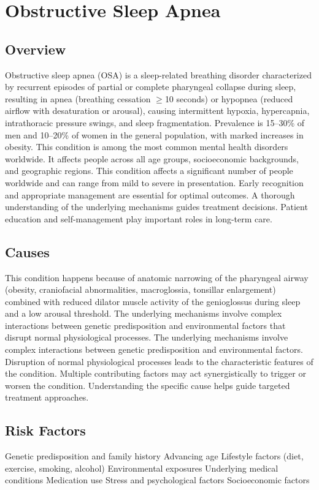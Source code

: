 \chapter{Obstructive Sleep Apnea}
\label{sec:Obstructive Sleep Apnea}

\section{Overview}
Obstructive sleep apnea (OSA) is a sleep-related breathing disorder characterized by recurrent episodes of partial or complete pharyngeal collapse during sleep, resulting in apnea (breathing cessation $\ge$10 seconds) or hypopnea (reduced airflow with desaturation or arousal), causing intermittent hypoxia, hypercapnia, intrathoracic pressure swings, and sleep fragmentation. Prevalence is 15--30\% of men and 10--20\% of women in the general population, with marked increases in obesity. This condition is among the most common mental health disorders worldwide. It affects people across all age groups, socioeconomic backgrounds, and geographic regions. This condition affects a significant number of people worldwide and can range from mild to severe in presentation. Early recognition and appropriate management are essential for optimal outcomes. A thorough understanding of the underlying mechanisms guides treatment decisions. Patient education and self-management play important roles in long-term care.
\section{Causes}
This condition happens because of anatomic narrowing of the pharyngeal airway (obesity, craniofacial abnormalities, macroglossia, tonsillar enlargement) combined with reduced dilator muscle activity of the genioglossus during sleep and a low arousal threshold. The underlying mechanisms involve complex interactions between genetic predisposition and environmental factors that disrupt normal physiological processes. The underlying mechanisms involve complex interactions between genetic predisposition and environmental factors. Disruption of normal physiological processes leads to the characteristic features of the condition. Multiple contributing factors may act synergistically to trigger or worsen the condition. Understanding the specific cause helps guide targeted treatment approaches.
\section{Risk Factors}
Genetic predisposition and family history Advancing age Lifestyle factors (diet, exercise, smoking, alcohol) Environmental exposures Underlying medical conditions Medication use Stress and psychological factors Socioeconomic factors

